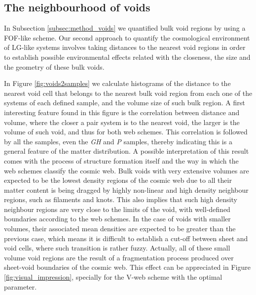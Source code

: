 \documentclass[a4,useAMS,usenatbib,usegraphicx]{latex/mn2e}
\begin{document}
\subsection{The neighbourhood of voids}
\label{subsec:neighbourhood_voids}



In Subsection \ref{subsec:method_voids} we quantified bulk void regions 
by using a FOF-like scheme. Our second approach to quantify the 
cosmological environment of LG-like systems involves taking distances to 
the nearest void regions in order to establish possible environmental 
effects related with the closeness, the size and the geometry of these 
bulk voids.



In Figure \ref{fig:voids2samples} we calculate histograms of the distance 
to the nearest void cell that belongs to the nearest bulk void region from 
each one of the systems of each defined sample, and the volume size of 
such bulk region. A first interesting feature found in this figure is the 
correlation between distance and volume, where the closer a pair system is 
to the nearest void, the larger is the volume of such void, and thus for
both web schemes. This correlation is followed by all the samples, even 
the \textit{GH} and \textit{P} samples, thereby indicating this is a 
general feature of the matter distribution. A possible interpretation of 
this result comes with the process of structure formation itself and the 
way in which the web schemes classify the cosmic web. Bulk voids with very 
extensive volumes are expected to be the lowest density regions of the 
cosmic web due to all their matter content is being dragged by highly 
non-linear and high density neighbour regions, such as filaments and knots. 
This also implies that such high density neighbour regions are very close 
to the limits of the void, with well-defined boundaries according to the 
web schemes. In the case of voids with smaller volumes, their associated 
mean densities are expected to be greater than the previous case, which 
means it is difficult to establish a cut-off between sheet and void cells, 
where such transition is rather fuzzy. Actually, all of these small volume
void regions are the result of a fragmentation process produced over 
sheet-void boundaries of the cosmic web. This effect can be appreciated 
in Figure \ref{fig:visual_impression}, specially for the V-web scheme with 
the optimal parameter.
\end{document}
